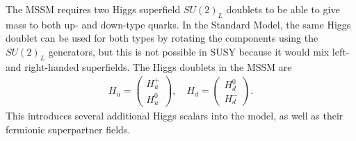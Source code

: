 \documentclass[twoside,english]{uiofysmaster}
\begin{document}
The MSSM requires two Higgs superfield $SU(2)_L$ doublets to be able to give mass to both up- and down-type quarks. In the Standard Model, the same Higgs doublet can be used for both types by rotating the components using the $SU(2)_L$ generators, but this is not possible in SUSY because it would mix left- and right-handed superfields. The Higgs doublets in the MSSM are
\begin{align}
	H_u = \begin{pmatrix}
		H_u^+ \\ H_u^0
	\end{pmatrix}, \quad H_d = \begin{pmatrix}
		H_d^0 \\ H_d^-
	\end{pmatrix}.
\end{align}
This introduces several additional Higgs scalars into the model, as well as their fermionic superpartner fields.
\end{document}
